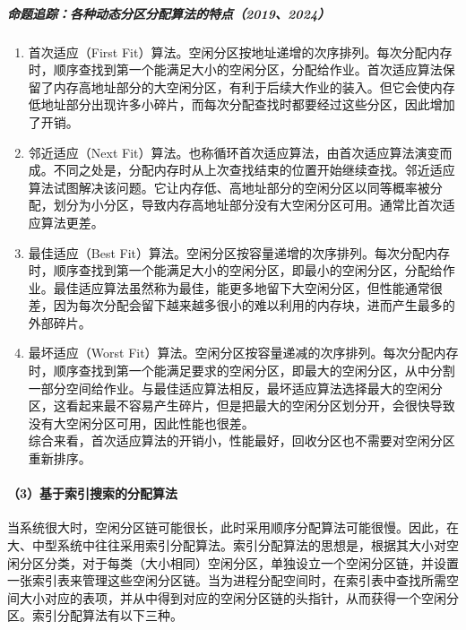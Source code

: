 \documentclass{ctexbook}
\begin{document}
	\subparagraph{命题追踪：各种动态分区分配算法的特点（2019、2024）}
	\begin{enumerate}
		\item 首次适应（First Fit）算法。空闲分区按地址递增的次序排列。每次分配内存时，顺序查找到第一个能满足大小的空闲分区，分配给作业。首次适应算法保留了内存高地址部分的大空闲分区，有利于后续大作业的装入。但它会使内存低地址部分出现许多小碎片，而每次分配查找时都要经过这些分区，因此增加了开销。
		\item 邻近适应（Next Fit）算法。也称循环首次适应算法，由首次适应算法演变而成。不同之处是，分配内存时从上次查找结束的位置开始继续查找。邻近适应算法试图解决该问题。它让内存低、高地址部分的空闲分区以同等概率被分配，划分为小分区，导致内存高地址部分没有大空闲分区可用。通常比首次适应算法更差。
		\item 最佳适应（Best Fit）算法。空闲分区按容量递增的次序排列。每次分配内存时，顺序查找到第一个能满足大小的空闲分区，即最小的空闲分区，分配给作业。最佳适应算法虽然称为最佳，能更多地留下大空闲分区，但性能通常很差，因为每次分配会留下越来越多很小的难以利用的内存块，进而产生最多的外部碎片。
	\item 最坏适应（Worst Fit）算法。空闲分区按容量递减的次序排列。每次分配内存时，顺序查找到第一个能满足要求的空闲分区，即最大的空闲分区，从中分割一部分空间给作业。与最佳适应算法相反，最坏适应算法选择最大的空闲分区，这看起来最不容易产生碎片，但是把最大的空闲分区划分开，会很快导致没有大空闲分区可用，因此性能也很差。 \\
	综合来看，首次适应算法的开销小，性能最好，回收分区也不需要对空闲分区重新排序。
	\end{enumerate}
	
	\paragraph{（3）基于索引搜索的分配算法}
	当系统很大时，空闲分区链可能很长，此时采用顺序分配算法可能很慢。因此，在大、中型系统中往往采用索引分配算法。索引分配算法的思想是，根据其大小对空闲分区分类，对于每类（大小相同）空闲分区，单独设立一个空闲分区链，并设置一张索引表来管理这些空闲分区链。当为进程分配空间时，在索引表中查找所需空间大小对应的表项，并从中得到对应的空闲分区链的头指针，从而获得一个空闲分区。索引分配算法有以下三种。
	
\end{document}
